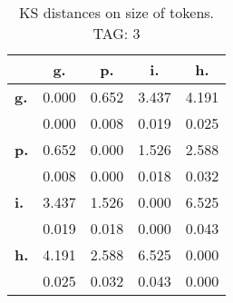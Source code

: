 \begin{table}[h!]
\begin{center}
\begin{tabular}{| l || c | c | c | c |}\hline
 & {\bf g.} & {\bf p.} & {\bf i.} & {\bf h.} \\\hline\hline
{\bf g.} & 0.000 & 0.652 & 3.437 & 4.191 \\
{\bf } & 0.000 & 0.008 & 0.019 & 0.025 \\\hline
{\bf p.} & 0.652 & 0.000 & 1.526 & 2.588 \\
{\bf } & 0.008 & 0.000 & 0.018 & 0.032 \\\hline
{\bf i.} & 3.437 & 1.526 & 0.000 & 6.525 \\
{\bf } & 0.019 & 0.018 & 0.000 & 0.043 \\\hline
{\bf h.} & 4.191 & 2.588 & 6.525 & 0.000 \\
{\bf } & 0.025 & 0.032 & 0.043 & 0.000 \\\hline
\end{tabular}
\caption{KS distances on size of tokens. TAG: 3}
\end{center}
\end{table}